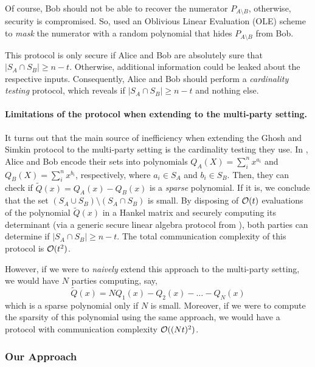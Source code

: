  Of course, Bob should not be able to recover the numerator $P_{A\setminus B}$, otherwise, security is compromised. So, \cite{C:GhoSim19} used an Oblivious Linear Evaluation (OLE) scheme to \emph{mask} the numerator with a random polynomial that hides $P_{A\setminus B}$ from Bob.

This protocol is only secure if Alice and Bob are absolutely sure that  $|S_A\cap S_B|\geq n-t$. Otherwise, additional information could be leaked about the respective inputs. Consequently, Alice and Bob should perform a \emph{cardinality testing} protocol, which reveals if $|S_A\cap S_B|\geq n-t$ and nothing else. 


\paragraph{Limitations of the protocol when extending to the multi-party setting.} It turns out that the main source of inefficiency when extending the Ghosh and Simkin protocol to the multi-party setting is the cardinality testing they use. In \cite{C:GhoSim19}, Alice and Bob  encode their sets into polynomials $Q_A(X)=\sum^n_ix^{a_i}$ and $Q_B(X)=\sum^n_ix^{b_i}$, respectively, where $a_i\in S_A$ and $b_i\in S_B$. Then, they can check if $\tilde Q(x)=Q_A(x)-Q_B(x)$ is a \emph{sparse} polynomial. If it is, we conclude that the set $(S_A\cup S_B)\setminus (S_A\cap S_B)$ is small. By disposing of $\mathcal{O}(t)$ evaluations of the polynomial $\tilde Q(x)$ in a Hankel matrix \cite{GJR10} and securely computing its determinant (via a generic secure linear algebra protocol from \cite{TCC:KMWF07}), both parties can determine if $|S_A\cap S_B|\geq n-t$. The total communication complexity of this protocol is $\mathcal{O}(t^2)$.\footnotemark


However, if we were to \emph{naively} extend this approach to the multi-party setting, we would have $N$ parties computing, say, $$\tilde Q(x)=N Q_1(x)-Q_2(x)- \dots - Q_N(x)$$ which is a sparse polynomial only if $N$ is small. Moreover, if we were to compute the sparsity of this polynomial using the same approach, we would have a protocol with communication complexity $\mathcal{O}((Nt)^2)$.

\subsubsection{Our Approach}

